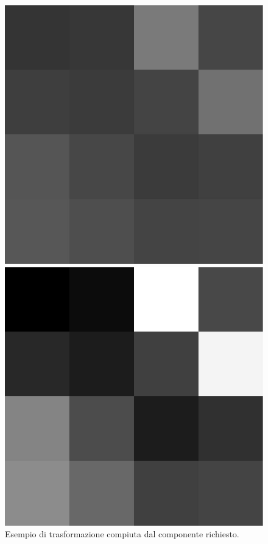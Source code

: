 \documentclass{article}
\begin{document}
\begin{figure}[h]
    \centering
    \begin{minipage}[c]{.3\linewidth}
        \centering
        \includegraphics[scale=0.21]{immSorg.jpg}
    \end{minipage}\hspace{20pt}
    \begin{minipage}[c]{.3\linewidth}
        \centering
        \includegraphics[scale=0.21]{immElab.jpg}
    \end{minipage}
    \caption{Esempio di trasformazione compiuta dal componente richiesto.}
    \label{fig:esempioFIG}
\end{figure}
\end{document}

